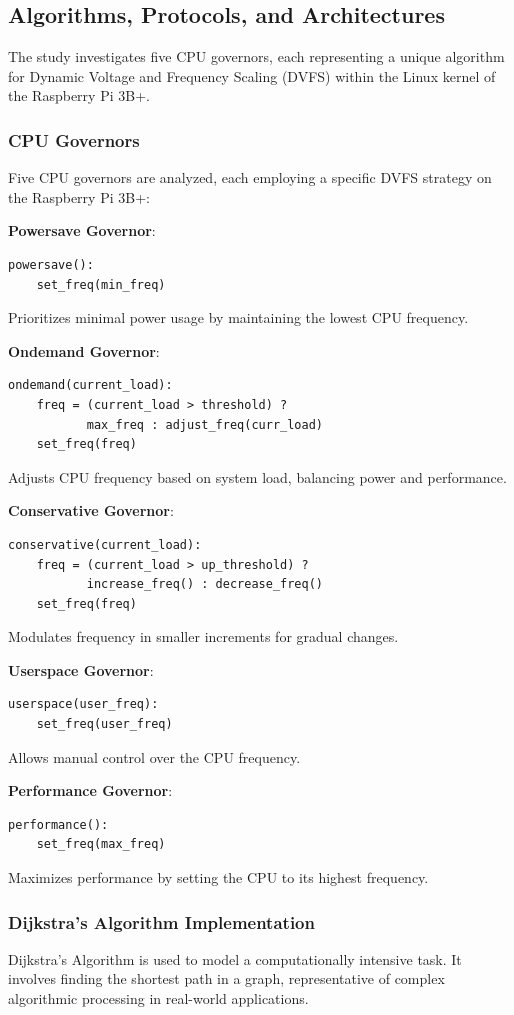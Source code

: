 \documentclass[conference]{IEEEtran}
\begin{document}
\subsection{Algorithms, Protocols, and Architectures}
The study investigates five CPU governors, each representing a unique algorithm for Dynamic Voltage and Frequency Scaling (DVFS) within the Linux kernel of the Raspberry Pi 3B+.

\subsubsection{CPU Governors}
Five CPU governors are analyzed, each employing a specific DVFS strategy on the Raspberry Pi 3B+:

\textbf{Powersave Governor}: 
\begin{verbatim}
powersave():
    set_freq(min_freq)
\end{verbatim}
Prioritizes minimal power usage by maintaining the lowest CPU frequency.

\textbf{Ondemand Governor}: 
\begin{verbatim}
ondemand(current_load):
    freq = (current_load > threshold) ? 
           max_freq : adjust_freq(curr_load)
    set_freq(freq)
\end{verbatim}
Adjusts CPU frequency based on system load, balancing power and performance.

\textbf{Conservative Governor}: 
\begin{verbatim}
conservative(current_load):
    freq = (current_load > up_threshold) ? 
           increase_freq() : decrease_freq()
    set_freq(freq)
\end{verbatim}
Modulates frequency in smaller increments for gradual changes.

\textbf{Userspace Governor}:
\begin{verbatim}
userspace(user_freq):
    set_freq(user_freq)
\end{verbatim}
Allows manual control over the CPU frequency.

\textbf{Performance Governor}: 
\begin{verbatim}
performance():
    set_freq(max_freq)
\end{verbatim}
Maximizes performance by setting the CPU to its highest frequency.
\subsubsection{Dijkstra's Algorithm Implementation}
Dijkstra's Algorithm is used to model a computationally intensive task. It involves finding the shortest path in a graph, representative of complex algorithmic processing in real-world applications.
\end{document}
